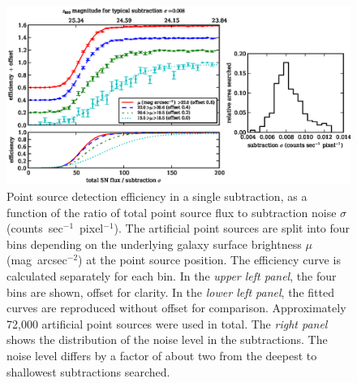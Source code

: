 \begin{figure}[t]
\includegraphics[width=\textwidth]{figures/clrate/eff_color.eps}
\caption[Point source detection efficiency]{Point source detection 
efficiency in a single subtraction, 
as a function of the ratio of total point source flux to subtraction
noise $\sigma$ (counts~sec$^{-1}$~pixel$^{-1}$). The artificial point
sources are split into four bins depending on the underlying galaxy
surface brightness $\mu$ (mag~arcsec$^{-2}$) at the point source
position. The efficiency curve is calculated separately for each
bin. In the \emph{upper left panel}, the four bins are shown, offset for
clarity. In the \emph{lower left panel}, the fitted curves are reproduced
without offset for comparison. Approximately 72,000 artificial point
sources were used in total. The \emph{right panel} shows the distribution of
the noise level in the subtractions. The noise level differs by a
factor of about two from the deepest to shallowest subtractions
searched.\label{fig:eff}}
\end{figure}


